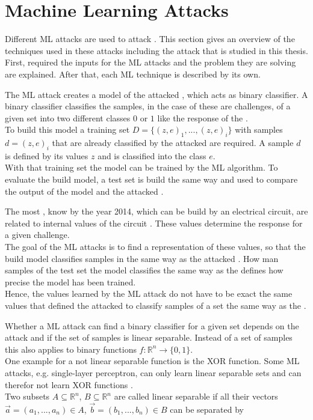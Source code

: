 \chapter{Machine Learning Attacks}
\label{cap:mla}

Different \ac{ML} attacks are used to attack \pufs.
This section gives an overview of the techniques used in these attacks including the attack that is studied in this thesis.\\
First, required the inputs for the \ac{ML} attacks and the problem they are solving are explained.
After that, each \ac{ML} technique is described by its own.

The \ac{ML} attack creates a \puf model of the attacked \puf, which acts as binary classifier.
A binary classifier classifies the samples, in the case of \pufs these are challenges, of a given set into two different classes $0$ or $1$ like the response of the \puf.\\
To build this model a training set $D = \{(z, e)_1, ..., (z,e)_i\}$ with samples $d = (z, e)_i$ that are already classified by the attacked \puf are required.
A sample $d$ is defined by its values $z$ and is classified into the class $e$.\\
With that training set the model can be trained by the \ac{ML} algorithm.
To evaluate the build model, a test set is build the same way and used to compare the output of the \puf model and the attacked \puf.

The most \pufs, know by the year 2014, which can be build by an electrical circuit, are related to internal values of the circuit \cite{Ruhrmair2014PUFOverview}.
These values determine the response for a given challenge.\\
The goal of the \ac{ML} attacks is to find a representation of these values, so that the build model classifies samples in the same way as the attacked \puf. %
How man samples of the test set the model classifies the same way as the \puf defines how precise the model has been trained.\\
Hence, the values learned by the \ac{ML} attack do not have to be exact the same values that defined the attacked \puf to classify samples of a set the same way as the \puf.

Whether a \ac{ML} attack can find a binary classifier for a given set depends on the attack and if the set of samples is linear separable. 
Instead of a set of samples this also applies to binary functions $f: \mathbb{R}^n \to \{0,1\}$.\\ %
One example for a not linear separable function is the \ac{XOR} function. %
Some \ac{ML} attacks, e.g. single-layer perceptron, can only learn linear separable sets and can therefor not learn \ac{XOR} functions \cite{Minsky1969Perceptrons:Geometry}.\\
Two subsets $A \subseteq \mathbb{R}^n$, $B \subseteq \mathbb{R}^n$ are called linear separable if all their vectors $\vec{a} = (a_1, ..., a_n) \in A$, $\vec{b} = (b_1, ..., b_n) \in B$ can be separated by

